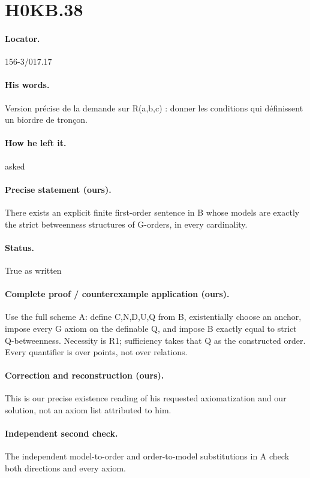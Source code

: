 \section*{H0KB.38}\label{statement:H0KB.38}
\paragraph{Locator.} 156-3/017.17

\paragraph{His words.} Version précise de la demande sur R(a,b,c) : donner les conditions qui définissent un biordre de tronçon.

\paragraph{How he left it.} asked

\paragraph{Precise statement (ours).} There exists an explicit finite first-order sentence in B whose models are exactly the strict betweenness structures of G-orders, in every cardinality.

\paragraph{Status.} True as written

\paragraph{Complete proof / counterexample application (ours).} Use the full scheme A: define C,N,D,U,Q from B, existentially choose an anchor, impose every G axiom on the definable Q, and impose B exactly equal to strict Q-betweenness. Necessity is R1; sufficiency takes that Q as the constructed order. Every quantifier is over points, not over relations.

\paragraph{Correction and reconstruction (ours).} This is our precise existence reading of his requested axiomatization and our solution, not an axiom list attributed to him.

\paragraph{Independent second check.} The independent model-to-order and order-to-model substitutions in A check both directions and every axiom.

